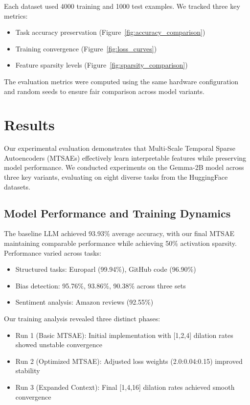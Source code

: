 \documentclass{article} %
\begin{document}
Each dataset used 4000 training and 1000 test examples. We tracked three key metrics:
\begin{itemize}
    \item Task accuracy preservation (Figure~\ref{fig:accuracy_comparison})
    \item Training convergence (Figure~\ref{fig:loss_curves})
    \item Feature sparsity levels (Figure~\ref{fig:sparsity_comparison})
\end{itemize}

The evaluation metrics were computed using the same hardware configuration and random seeds to ensure fair comparison across model variants.

\section{Results}
\label{sec:results}

Our experimental evaluation demonstrates that Multi-Scale Temporal Sparse Autoencoders (MTSAEs) effectively learn interpretable features while preserving model performance. We conducted experiments on the Gemma-2B model across three key variants, evaluating on eight diverse tasks from the HuggingFace datasets.

\subsection{Model Performance and Training Dynamics}
The baseline LLM achieved 93.93\% average accuracy, with our final MTSAE maintaining comparable performance while achieving 50\% activation sparsity. Performance varied across tasks:

\begin{itemize}
    \item Structured tasks: Europarl (99.94\%), GitHub code (96.90\%)
    \item Bias detection: 95.76\%, 93.86\%, 90.38\% across three sets
    \item Sentiment analysis: Amazon reviews (92.55\%)
\end{itemize}

Our training analysis revealed three distinct phases:

\begin{itemize}
    \item Run 1 (Basic MTSAE): Initial implementation with [1,2,4] dilation rates showed unstable convergence
    \item Run 2 (Optimized MTSAE): Adjusted loss weights (2.0:0.04:0.15) improved stability
    \item Run 3 (Expanded Context): Final [1,4,16] dilation rates achieved smooth convergence
\end{itemize}
\end{document}
